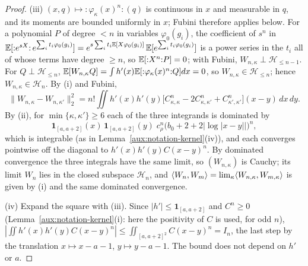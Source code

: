 \begin{proof}
(iii) $(x,q)\mapsto{:}\varphi_\kappa(x)^n{:}(q)$ is continuous in $x$ and measurable in $q$,
and its moments are bounded uniformly in $x$; Fubini therefore applies below.  For a
polynomial $P$ of degree $<n$ in variables $\varphi_0(g_i)$, the coefficient of $s^n$ in
$\mathbb{E}[{:}e^{sX}{:}\,e^{\sum_it_i\varphi_0(g_i)}]=e^{s\sum_it_i\mathbb{E}[X\varphi_0(g_i)]}\,
\mathbb{E}[e^{\sum_it_i\varphi_0(g_i)}]$ is a power series in the $t_i$ all of whose terms have
degree $\ge n$, so $\mathbb{E}[{:}X^n{:}P]=0$; with Fubini, $W_{n,\kappa}\perp\mathcal H_{\le n-1}$.
For $Q\perp\mathcal H_{\le n}$, $\mathbb{E}[W_{n,\kappa}Q]=\int h'(x)\mathbb{E}[{:}\varphi_\kappa(x)^n{:}Q]dx=0$,
so $W_{n,\kappa}\in\mathcal H_{\le n}$; hence $W_{n,\kappa}\in\mathcal H_n$.  By (i) and
Fubini,
\[
 \|W_{n,\kappa}-W_{n,\kappa'}\|_2^2=n!\iint h'(x)h'(y)\bigl[C_{\kappa,\kappa}^n-2C_{\kappa,\kappa'}^n
 +C_{\kappa',\kappa'}^n\bigr](x-y)\,dx\,dy .
\]
By (ii), for $\min\{\kappa,\kappa'\}\ge6$ each of the three integrands is dominated by
\[
 \mathbf 1_{[a,a+2]}(x)\,\mathbf 1_{[a,a+2]}(y)\;c_\rho^n\bigl(b_0+2+2|\log|x-y||\bigr)^n ,
\]
which is integrable (as in Lemma~\ref{aux:notation-kernel}(iv)), and each converges pointwise off the
diagonal to $h'(x)h'(y)C(x-y)^n$.  By dominated convergence the three integrals have the same
limit, so $(W_{n,\kappa})$ is Cauchy; its limit $W_n$ lies in the closed subspace $\mathcal
H_n$, and $\langle W_n,W_m\rangle=\lim_\kappa\langle W_{n,\kappa},W_{m,\kappa}\rangle$ is given by (i) and the
same dominated convergence.

(iv) Expand the square with (iii).  Since $|h'|\le\mathbf 1_{[a,a+2]}$ and $C^n\ge0$
(Lemma~\ref{aux:notation-kernel}(i): here the positivity of $C$ is used, for odd $n$),
$|\iint h'(x)h'(y)C(x-y)^n|\le\iint_{[a,a+2]^2}C(x-y)^n=I_n$, the last step by the
translation $x\mapsto x-a-1$, $y\mapsto y-a-1$.  The bound does not depend on $h'$ or $a$.
\end{proof}

